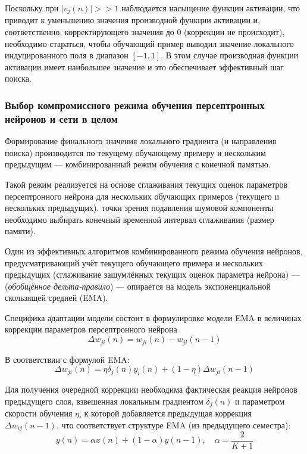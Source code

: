 \documentclass{article}
\numberwithin{equation}{subsection}
\begin{document}
Поскольку при $\lvert v_j(n) \rvert >> 1$ наблюдается насыщение функции активации,
что приводит к уменьшению значения производной функции активации и, соответственно,
корректирующего значения до 0 (коррекции не происходит), необходимо стараться, чтобы
обучающий пример выводил значение локального индуцированного поля 
в диапазон $\left[-1,1\right]$.
В этом случае производная функции активации имеет наибольшее значение и это обеспечивает
эффективный шаг поиска.




\subsubsection{Выбор компромиссного режима обучения персептронных нейронов и сети в целом}

Формирование финального значения локального градиента (и направления поиска) производится
по текущему обучающему примеру и нескольким предыдущим --- комбинированный режим обучения
с конечной памятью.

Такой режим реализуется на основе сглаживания текущих оценок параметров персептронного 
нейрона для нескольких обучающих примеров (текущего и нескольких предыдущих).
точки зрения подавления шумовой компоненты необходимо выбирать конечный временной 
интервал сглаживания (размер памяти). 

Один из эффективных алгоритмов комбинированного режима обучения нейронов, предусматривающий
учёт текущего обучающего примера и нескольких предыдущих (сглаживание зашумлённых 
текущих оценок параметра нейрона) --- (\textit{обобщённое дельта-правило}) --- опирается 
на модель экспоненциальной скользящей средней (EMA).

Специфика адаптации модели состоит в формулировке модели EMA в величинах коррекции 
параметров персептронного нейрона
\begin{equation}
    \Delta w_{ji}(n) = w_{ji}(n) - w_{ji}(n-1)
\end{equation}

В соответствии с формулой EMA:
\begin{equation}
    \Delta w_{ji}(n) = \eta \delta_j(n) y_i(n) + (1-\eta) \Delta w_{ji}(n-1)
\end{equation}

Для получения очередной коррекции необходима фактическая реакция нейронов предыдущего
слоя, взвешенная локальным градиентом $\delta_j(n)$ и параметром скорости обучения $\eta$,
к которой добавляется предыдущая коррекция $\Delta w_{ij}(n-1)$, что соответствует
структуре EMA (из предыдущего семестра):
\begin{equation}
    y(n)=\alpha x(n) + (1 - \alpha) y(n-1), \quad \alpha = \dfrac{2}{K+1}
\end{equation}
\end{document}
